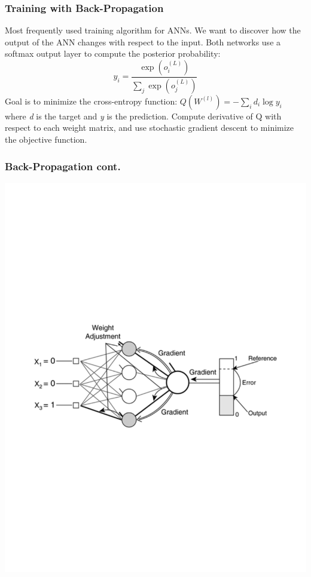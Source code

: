 \documentclass[notes]{beamer}
\begin{document}
\begin{frame}
	\frametitle{Training with Back-Propagation}
	\begin{center}
		Most frequently used training algorithm for ANNs. We want to discover how the output of the ANN changes with respect to the input. Both networks use a softmax output layer to compute the posterior probability:
		\begin{equation*}
		y_{i} = \frac{\exp(o_{i}^{(L)})}{\sum_{j}\exp(o_{j}^{(L)})}
		\end{equation*}
		Goal is to minimize the cross-entropy function: $Q({W^{(l)}}) = -\sum_{i}d_{i}\log y_{i}$ where \textit{d} is the target and \textit{y} is the prediction.
		\vfill
		Compute derivative of Q with respect to each weight matrix, and use stochastic gradient descent to minimize the objective function.
	\end{center}
\end{frame}

\begin{frame}
	\frametitle{Back-Propagation cont.}
	\includegraphics[scale=0.65, trim=2cm 0 0 8cm, clip=true]{backprop.pdf}
\end{frame}
\end{document}
